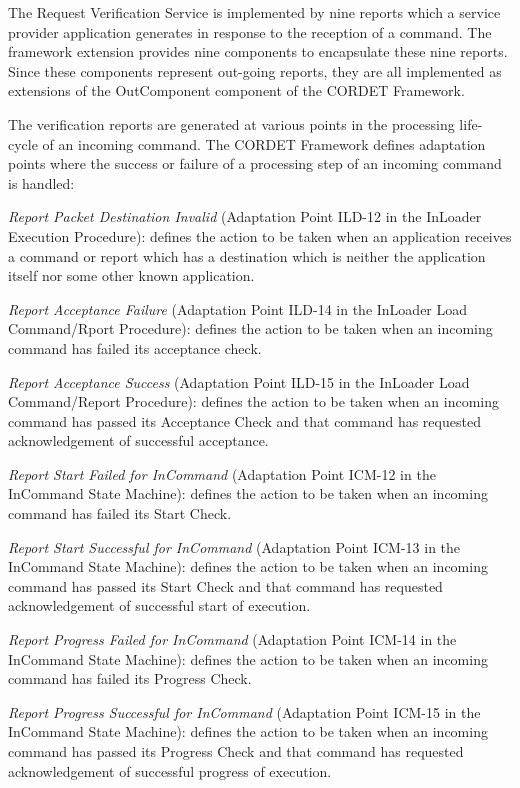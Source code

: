 \documentclass[a4paper,10pt]{article}
\newenvironment{fw_enumerate}					%
{\begin{enumerate}
  \setlength{\itemsep}{1mm}
  \setlength{\parskip}{0pt}
  \setlength{\parsep}{0pt}}
{\end{enumerate}}
\begin{document}
The Request Verification Service is implemented by nine reports which a service provider application generates in response to the reception of a command. The framework extension provides nine components to encapsulate these nine reports. Since these components represent out-going reports, they are all implemented as extensions of the OutComponent component of the CORDET Framework. 

The verification reports are generated at various points in the processing life-cycle of an incoming command. The CORDET Framework defines adaptation points where the success or failure of a processing step of an incoming command is handled: 

\begin{fw_enumerate}
\item \textit{Report Packet Destination Invalid} (Adaptation Point ILD-12 in the InLoader Execution Procedure): defines the action to be taken when an application receives a command or report which has a destination which is neither the application itself nor some other known application.
\item \textit{Report Acceptance Failure} (Adaptation Point ILD-14 in the InLoader Load Command/Rport Procedure): defines the action to be taken when an incoming command has failed its acceptance check.
\item \textit{Report Acceptance Success} (Adaptation Point ILD-15 in the InLoader Load Command/Report Procedure): defines the action to be taken when an incoming command has passed its Acceptance Check and that command has requested acknowledgement of successful acceptance.
\item \textit{Report Start Failed for InCommand} (Adaptation Point ICM-12 in the InCommand State Machine): defines the action to be taken when an incoming command has failed its Start Check.
\item \textit{Report Start Successful for InCommand} (Adaptation Point ICM-13 in the InCommand State Machine): defines the action to be taken when an incoming command has passed its Start Check and that command has requested acknowledgement of successful start of execution.
\item \textit{Report Progress Failed for InCommand} (Adaptation Point ICM-14 in the InCommand State Machine): defines the action to be taken when an incoming command has failed its Progress Check.
\item \textit{Report Progress Successful for InCommand} (Adaptation Point ICM-15 in the InCommand State Machine): defines the action to be taken when an incoming command has passed its Progress Check and that command has requested acknowledgement of successful progress of execution.

\end{fw_enumerate}
\end{document}
